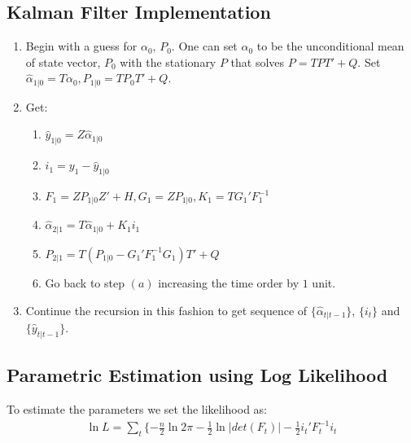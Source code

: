 \documentclass[12pt]{article}
\begin{document}
\subsection{Kalman Filter Implementation}
\begin{enumerate}
\item Begin with a guess for $\alpha_0$, $P_0$.  One can set $\alpha_0$ to be the unconditional mean of state vector, $P_0$ with the stationary $P$ that solves $P = TPT' + Q$. Set $\hat{\alpha}_{1|0} = T \alpha_0, P_{1|0} = TP_{0}T' + Q$.
\item Get:
\begin{enumerate}
\item $\hat{y}_{1|0} = Z\hat{\alpha}_{1|0}$
\item $i_1 = y_1 - \hat{y}_{1|0} $
\item $F_1 = ZP_{1|0}Z' + H, G_1 = ZP_{1|0}, K_1 = TG_1'F_1^{-1}$
\item $\hat{\alpha}_{2|1} = T \hat{\alpha}_{1|0} + K_1 i_1$
\item $P_{2|1} = T(P_{1|0} - G_1'F_1^{-1}G_1)T' + Q$
\item Go back to step $(a)$ increasing the time order by $1$ unit.
\end{enumerate}
\item Continue the recursion in this fashion to get sequence of $\{ \hat{\alpha}_{t|t-1} \}$, $\{i_t\}$ and $\{\hat{y}_{t|t-1}\}.$
\end{enumerate}

\subsection{Parametric Estimation using Log Likelihood}
To estimate the parameters we set the likelihood as:
\begin{align*}
\ln L = \sum_t \{ -\frac{n}{2} \ln 2\pi -\frac{1}{2}\ln |det(F_t)| - \frac{1}{2}i_t'F_t^{-1}i_t 
\end{align*}
\end{document}
